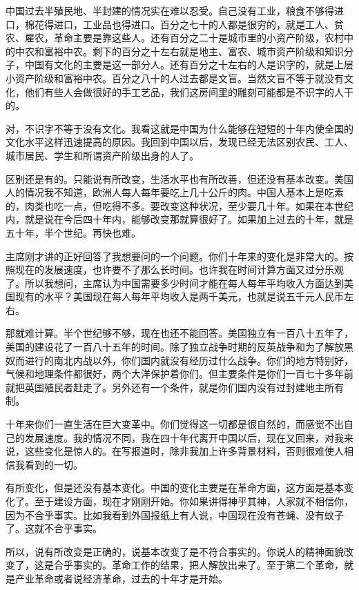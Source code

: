 中国过去半殖民地、半封建的情况实在难以忍受。自己没有工业，粮食不够得进口，棉花得进口，工业品也得进口。百分之七十的人都是很穷的，就是工人、贫农、雇农，革命主要是靠这些人。还有百分之二十是城市里的小资产阶级，农村中的中农和富裕中农。剩下的百分之十左右就是地主、富农、城市资产阶级和知识分子，中国有文化的主要是这一部分人。还有百分之十左右的人是识字的，就是上层小资产阶级和富裕中农。百分之八十的人过去都是文盲。当然文盲不等于就没有文化，他们有些人会做很好的手工艺品，我们这房间里的雕刻可能都是不识字的人干的。

对，不识字不等于没有文化。我看这就是中国为什么能够在短短的十年内使全国的文化水平这样迅速提高的原因。我回到中国以后，发现已经无法区别农民、工人、城市居民、学生和所谓资产阶级出身的人了。

区别还是有的。只能说有所改变，生活水平也有所改善，但还没有基本改变。美国人的情况我不知道，欧洲人每人每年要吃上几十公斤的肉。中国人基本上是吃素的，肉类也吃一点，但吃得不多。要改变这种状况，至少要几十年。如果在本世纪内，就是说在今后四十年内，能够改变那就算很好了。如果加上过去的十年，就是五十年，半个世纪。再快也难。

主席刚才讲的正好回答了我想要问的一个问题。你们十年来的变化是非常大的。按照现在的发展速度，也许要不了那么长时间。也许我在时间计算方面又过分乐观了。所以我想问，主席认为中国需要多少时间才能在每人每年平均收入方面达到美国现有的水平？美国现在每人每年平均收入是两千美元，也就是说五千元人民币左右。

那就难计算。半个世纪够不够，现在也还不能回答。美国独立有一百八十五年了，美国的建设花了一百八十五年的时间。除了独立战争时期的反英战争和为了解放黑奴而进行的南北内战以外，你们国内就没有经历过什么战争。你们的地方特别好，气候和地理条件都很好，两个大洋保护着你们。但主要条件是你们一百七十多年前就把英国殖民者赶走了。另外还有一个条件，就是你们国内没有过封建地主所有制。

十年来你们一直生活在巨大变革中。你们觉得这一切都是很自然的，而感觉不出自己的发展速度。我的情况不同，我在四十年代离开中国以后，现在又回来，对我来说，这些变化是惊人的。在写报道时，除非我加上许多背景材料，否则很难使人相信我看到的一切。

有所变化，但是还没有基本变化。中国的变化主要是在革命方面，这方面是基本变化了。至于建设方面，现在才刚刚开始。你如果讲得神乎其神，人家就不相信你，因为不合乎事实。比如我看到外国报纸上有人说，中国现在没有苍蝇、没有蚊子了。这就不合乎事实。

所以，说有所改变是正确的，说基本改变了是不符合事实的。你说人的精神面貌改变了，这是合乎事实的。革命工作的结果，把人解放出来了。至于第二个革命，就是产业革命或者说经济革命，过去的十年才是开始。

